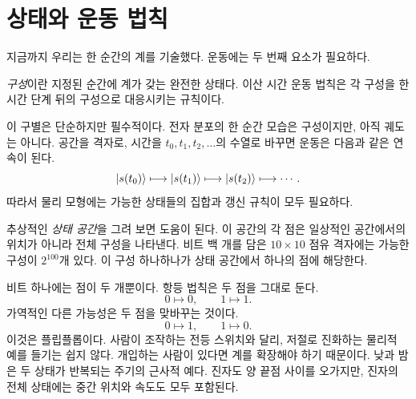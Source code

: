 \section{상태와 운동 법칙}

지금까지 우리는 한 순간의 계를 기술했다. 운동에는 두 번째 요소가 필요하다.

\begin{definition}
\emph{구성}이란 지정된 순간에 계가 갖는 완전한 상태다. 이산 시간 운동 법칙은 각 구성을 한 시간 단계 뒤의 구성으로 대응시키는 규칙이다.
\end{definition}

이 구별은 단순하지만 필수적이다. 전자 분포의 한 순간 모습은 구성이지만, 아직 궤도는 아니다. 공간을 격자로, 시간을 \(t_0,t_1,t_2,\ldots\)의 수열로 바꾸면 운동은 다음과 같은 연속이 된다.
\begin{equation}
  \left\lvert s(t_0)\right\rangle
  \longmapsto
  \left\lvert s(t_1)\right\rangle
  \longmapsto
  \left\lvert s(t_2)\right\rangle
  \longmapsto\cdots.
  \label{eq:l01-discrete-motion}
\end{equation}
따라서 물리 모형에는 가능한 상태들의 집합과 갱신 규칙이 모두 필요하다.

\begin{classroomqa}
\end{classroomqa}

추상적인 \emph{상태 공간}을 그려 보면 도움이 된다. 이 공간의 각 점은 일상적인 공간에서의 위치가 아니라 전체 구성을 나타낸다. 비트 백 개를 담은 \(10\times10\) 점유 격자에는 가능한 구성이 \(2^{100}\)개 있다. 이 구성 하나하나가 상태 공간에서 하나의 점에 해당한다.

비트 하나에는 점이 두 개뿐이다. 항등 법칙은 두 점을 그대로 둔다.
\begin{equation}
  0\mapsto0,
  \qquad
  1\mapsto1.
  \label{eq:l01-identity-update}
\end{equation}
가역적인 다른 가능성은 두 점을 맞바꾸는 것이다.
\begin{equation}
  0\mapsto1,
  \qquad
  1\mapsto0.
  \label{eq:l01-flip-update}
\end{equation}
이것은 플립플롭이다. 사람이 조작하는 전등 스위치와 달리, 저절로 진화하는 물리적 예를 들기는 쉽지 않다. 개입하는 사람이 있다면 계를 확장해야 하기 때문이다. 낮과 밤은 두 상태가 반복되는 주기의 근사적 예다. 진자도 양 끝점 사이를 오가지만, 진자의 전체 상태에는 중간 위치와 속도도 모두 포함된다.

